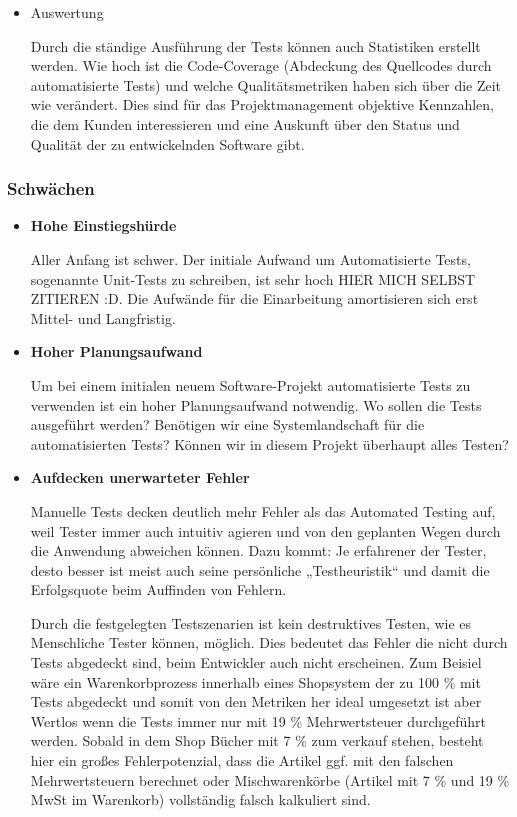 \begin{itemize}
	\item Auswertung
	
	Durch die ständige Ausführung der Tests können auch Statistiken erstellt werden. Wie hoch ist die Code-Coverage (Abdeckung des Quellcodes durch automatisierte Tests) und welche Qualitätsmetriken haben sich über die Zeit wie verändert. Dies sind für das Projektmanagement objektive Kennzahlen, die dem Kunden interessieren und eine Auskunft über den Status und Qualität der zu entwickelnden Software gibt.

\end{itemize}

\subsubsection{Schwächen}
\begin{itemize}	
	\item \textbf{Hohe Einstiegshürde}
	
	Aller Anfang ist schwer. Der initiale Aufwand um Automatisierte Tests, sogenannte Unit-Tests zu schreiben, ist sehr hoch HIER MICH SELBST ZITIEREN :D. Die Aufwände für die Einarbeitung amortisieren sich erst Mittel- und Langfristig.
	
	\item \textbf{Hoher Planungsaufwand}
	
	Um bei einem initialen neuem Software-Projekt automatisierte Tests zu verwenden ist ein hoher Planungsaufwand notwendig. Wo sollen die Tests ausgeführt werden? Benötigen wir eine Systemlandschaft für die automatisierten Tests? Können wir in diesem Projekt überhaupt alles Testen?
	
	\item \textbf{Aufdecken unerwarteter Fehler}
	
	Manuelle Tests decken deutlich mehr Fehler als das Automated Testing auf, weil Tester immer auch intuitiv agieren und von den geplanten Wegen durch die Anwendung abweichen können. Dazu kommt: Je erfahrener der Tester, desto besser ist meist auch seine persönliche „Testheuristik“ und damit die Erfolgsquote beim Auffinden von Fehlern.
	
	Durch die festgelegten Testszenarien ist kein destruktives Testen, wie es Menschliche Tester können, möglich. Dies bedeutet das Fehler die nicht durch Tests abgedeckt sind, beim Entwickler auch nicht erscheinen. Zum Beisiel wäre ein Warenkorbprozess innerhalb eines Shopsystem der zu 100 \% mit Tests abgedeckt und somit von den Metriken her ideal umgesetzt ist aber Wertlos wenn die Tests immer nur mit 19 \% Mehrwertsteuer durchgeführt werden. Sobald in dem Shop Bücher mit 7 \% zum verkauf stehen, besteht hier ein großes Fehlerpotenzial, dass die Artikel ggf. mit den falschen Mehrwertsteuern berechnet oder Mischwarenkörbe (Artikel mit 7 \% und 19 \% MwSt im Warenkorb) vollständig falsch kalkuliert sind. 
	
\end{itemize}
